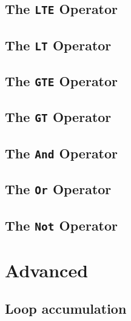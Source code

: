     \subsection{The \texttt{LTE} Operator}
    
    \subsection{The \texttt{LT} Operator}
    
    \subsection{The \texttt{GTE} Operator}
    
    \subsection{The \texttt{GT} Operator}
    
    \subsection{The \texttt{And} Operator}
    
    \subsection{The \texttt{Or} Operator}\label{evaln:ops:or}
    
    \subsection{The \texttt{Not} Operator}\label{evaln:ops:not}

\section{Advanced}
    \subsection{Loop accumulation}
